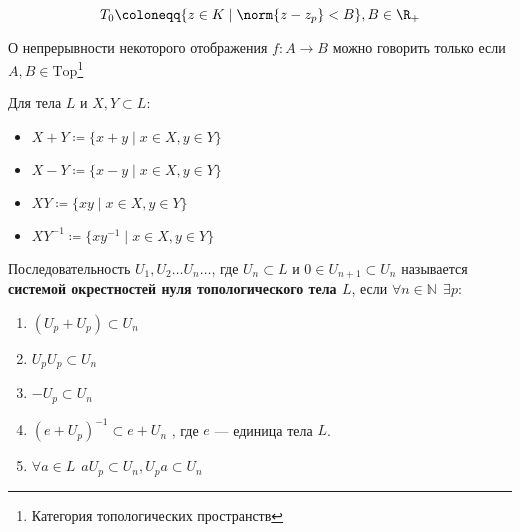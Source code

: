 \begin{example}
	\[T_0 \coloneqq \{z \in K \mid \norm{z - z_p} < B\}, B \in \R_+\]
\end{example}

О непрерывности некоторого отображения \(f : A \to B\) можно говорить только если \(A, B \in \mathrm{Top}\)\footnote{Категория топологических пространств}




\begin{notation}
	Для тела \(L\) и \(X, Y \subset L\):
	\begin{itemize}
		\item \(X+Y \coloneqq \{x + y \mid x \in X, y \in Y\}\)
		\item \(X-Y \coloneqq \{x - y \mid x \in X, y \in Y\}\)
		\item \(XY \coloneqq \{xy \mid x \in X, y \in Y\}\)
		\item \(XY^{-1} \coloneqq \{xy^{-1} \mid x \in X, y \in Y\}\)
	\end{itemize}
\end{notation}

\begin{definition}
	Последовательность \(U_1, U_2 \ldots U_n \ldots\),
	где \(U_n \subset L\) и \(0 \in U_{n + 1} \subset U_n\) называется
	\textbf{системой окрестностей нуля топологического тела \(L\)},
	если \(\forall n \in \mathbb{N} \ \ \exists p:\)
	\begin{enumerate}
		\item \((U_p + U_p) \subset U_n\)
		\item \(U_p U_p \subset U_n\)
		\item \(- U_p \subset U_n\)
		\item \((e + U_p)^{-1} \subset e + U_n\)
		      , где \(e\) --- единица тела \(L\).
		\item \(\forall a \in L \ \ a U_p \subset U_n, U_p a \subset U_n\)
	\end{enumerate}
\end{definition}

